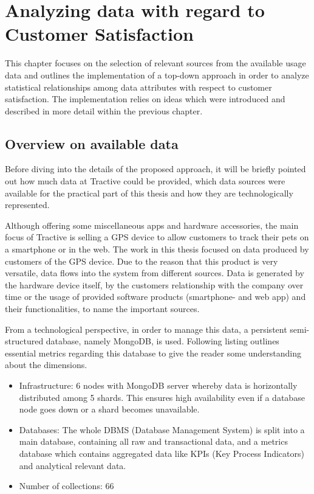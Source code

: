 \chapter{Analyzing  data with regard to Customer Satisfaction}
\label{ch:implementation}

This chapter focuses on the selection of relevant sources from the available usage data and outlines the implementation of a top-down approach in order to analyze statistical relationships among data attributes with respect to customer satisfaction. The implementation relies on ideas which were introduced and described in more detail within the previous chapter. 

\section{Overview on available data}
Before diving into the details of the proposed approach, it will be briefly pointed out how much data at Tractive could be provided, which data sources were available for the practical part of this thesis and how they are technologically represented. 

Although offering some miscellaneous apps and hardware accessories, the main focus of Tractive is selling a GPS device to allow customers to track their pets on a smartphone or in the web. The work in this thesis focused on data produced by customers of the GPS device. Due to the reason that this product is very versatile, data flows into the system from different sources. Data is generated by the hardware device itself, by the customers relationship with the company over time or the usage of provided software products (smartphone- and web app) and their functionalities, to name the important sources.

From a technological perspective, in order to manage this data, a persistent semi-structured database, namely MongoDB, is used. Following listing outlines essential metrics regarding this database to give the reader some understanding about the dimensions.

\begin{itemize}
	\item Infrastructure: 6 nodes with MongoDB server whereby data is horizontally distributed among 5 shards. This ensures high availability even if a database node goes down or a shard becomes unavailable.
	\item Databases: The whole DBMS (Database Management System) is split into a main database, containing all raw and transactional data, and a metrics database which contains aggregated data like KPIs (Key Process Indicators) and analytical relevant data. 
	\item Number of collections: 66
\end{itemize}

